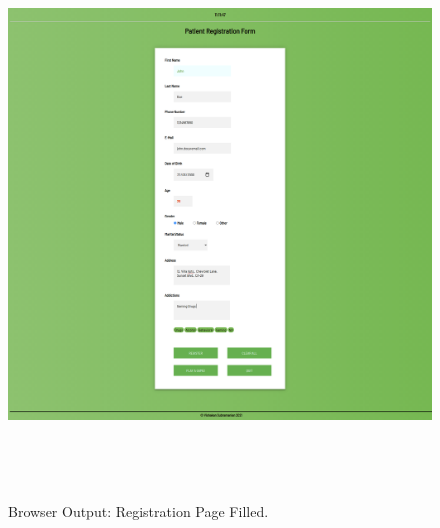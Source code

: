 \documentclass[12pt, a4]{article}
\begin{document}
\subsection*{}
\begin{figure}[h]
\centering
\caption{Browser Output: Registration Page Filled.}
\includegraphics[height=15cm, width=18cm]{Output/RegFormFilled.png}
\end{figure}

\newpage
\end{document}
